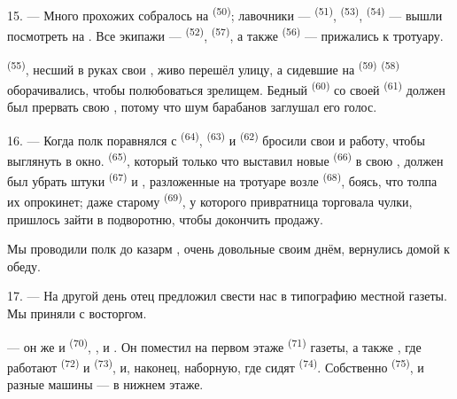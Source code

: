 15. --- Много прохожих собралось на  \textsuperscript{(50)};
лавочники ---  \textsuperscript{(51)}, 
\textsuperscript{(53)},  \textsuperscript{(54)} --- вышли посмотреть
на . Все экипажи --- 
\textsuperscript{(52)},  \textsuperscript{(57)}, а также
 \textsuperscript{(56)} --- прижались к тротуару.

\VUsaut{3.0mm}

 \textsuperscript{(55)}, несший в руках свои
, живо перешёл улицу, а сидевшие на
 \textsuperscript{(59)}  \textsuperscript{(58)}
оборачивались, чтобы полюбоваться зрелищем. Бедный 
\textsuperscript{(60)} со своей  \textsuperscript{(61)} должен был
прервать свою , потому что шум барабанов заглушал его голос.

16. --- Когда полк поравнялся с  \textsuperscript{(64)},
 \textsuperscript{(63)} и  \textsuperscript{(62)} бросили
свои  и работу, чтобы выглянуть в окно.
 \textsuperscript{(65)}, который только что выставил новые
 \textsuperscript{(66)} в свою , должен был убрать
штуки  \textsuperscript{(67)} и , разложенные на
тротуаре возле  \textsuperscript{(68)}, боясь, что толпа их
опрокинет; даже старому  \textsuperscript{(69)}, у которого
привратница торговала чулки, пришлось зайти в подворотню, чтобы докончить
продажу.

Мы проводили полк до казарм , очень довольные своим днём,
вернулись домой к обеду.

\VUsaut{3.0mm}

17. --- На другой день отец предложил свести нас в типографию местной
газеты. Мы приняли с восторгом.

 --- он же и  \textsuperscript{(70)},
,  и . Он поместил
на первом этаже  \textsuperscript{(71)} газеты, а также
, где работают  \textsuperscript{(72)} и
 \textsuperscript{(73)}, и, наконец, наборную, где сидят
 \textsuperscript{(74)}. Собственно 
\textsuperscript{(75)},  и разные машины --- в нижнем
этаже.


